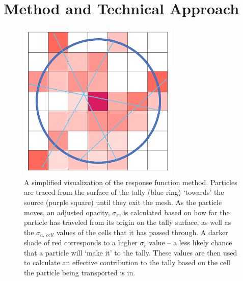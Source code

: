 \documentclass[]{article}
\begin{document}
\section{Method and Technical Approach}
	\begin{figure} [h!]
		\centering
		\includegraphics[height=3in]{Figures/resp_funct_pt_src_vis.png}
		\caption{A simplified visualization of the response function method. Particles are traced from the surface of the tally (blue ring) ‘towards’ the source (purple square) until they exit the mesh. As the particle moves, an adjusted opacity, $\sigma_{r}$, is calculated based on how far the particle has traveled from its origin on the tally surface, as well as the $\sigma_{a,~cell}$ values of the cells that it has passed through. A darker shade of red corresponds to a higher $\sigma_{r}$ value – a less likely chance that a particle will ‘make it’ to the tally. These values are then used to calculate an effective contribution to the tally based on the cell the particle being transported is in.}
		\label{fig:resp_funct_visual}
	\end{figure}
\end{document}
